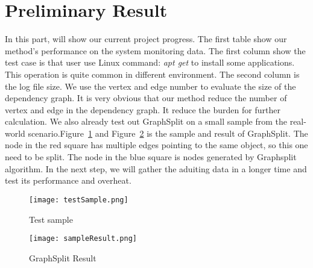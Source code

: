 

\section{Preliminary Result}

In this part, will show our current project progress. The first table show our method's performance on the system monitoring data. The first column show the test case is that user use Linux command: \textit{apt get} to install some applications. This operation is quite common in different environment. The second column is the log file size. We use the vertex and edge number to evaluate the size of the dependency graph. It is very obvious that our method reduce the number of vertex and edge in the dependency graph.  It reduce the burden for further calculation. We also already test out GraphSplit on a small sample from the real-world scenario.Figure~\ref{fig:splitsample} and Figure~\ref{fig:splitresult} is the sample and result of GraphSplit. The node in the red square has multiple edges pointing to the same object, so this one need to be split. The node in the blue square is nodes generated by Graphsplit algorithm. In the next step, we will gather the aduiting data in a longer time and test its performance and overheat. 


\begin{figure}
	\centering
	\texttt{[image: testSample.png]}
	\caption{Test sample}
	\label{fig:splitsample}
\end{figure}
\begin{figure}
	\centering
	\texttt{[image: sampleResult.png]}
	\caption{GraphSplit Result}
	\label{fig:splitresult}
\end{figure}
\vspace{3cm}


